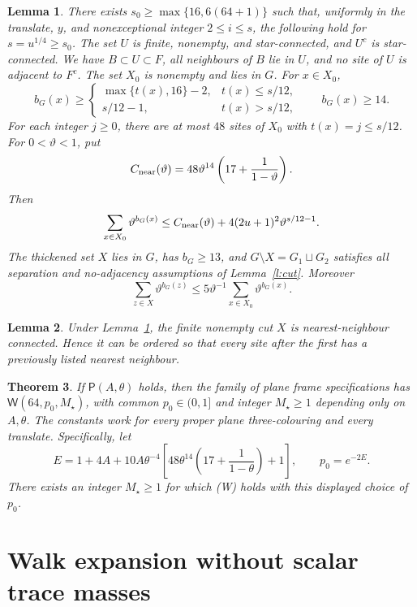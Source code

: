 \documentclass[11pt,reqno]{amsart}
\newtheorem{theorem}{Theorem}[section]
\newtheorem{lemma}[theorem]{Lemma}
\theoremstyle{definition}
\theoremstyle{remark}
\begin{document}
\begin{lemma}\label{l:cutgeom}
There exists \(s_0\ge\max\{16,6(64+1)\}\) such that, uniformly
in the translate, \(y\), and nonexceptional integer \(2\le i\le s\),
the following hold for \(s=u^{1/4}\ge s_0\).
The set \(U\) is finite, nonempty, and star-connected, and \(U^c\)
is star-connected. We have \(B\subset U\subset F\), all neighbours
of \(B\) lie in \(U\), and no site of \(U\) is adjacent to \(F^c\).
The set \(X_0\) is nonempty and lies in \(G\). For \(x\in X_0\),
\[
 b_G(x)\ge
 \begin{cases}\max\{t(x),16\}-2,&t(x)\le s/12,\\s/12-1,&t(x)>s/12,
 \end{cases}
 \qquad b_G(x)\ge14 .
 \]
For each integer \(j\ge0\), there are at most \(48\) sites of
\(X_0\) with \(t(x)=j\le s/12\).
For \(0<\vartheta<1\), put
\[
 C_{\rm near}(\vartheta)=48\vartheta^{14}
                \left(17+\frac1{1-\vartheta}\right).
\]
Then
\[
 \sum_{x\in X_0}\vartheta^{b_G(x)}
 \le C_{\rm near}(\vartheta)
                 +4(2u+1)^2\vartheta^{s/12-1}.
\]
The thickened set \(X\) lies in \(G\), has \(b_G\ge13\), and
\(G\setminus X=G_1\sqcup G_2\) satisfies all separation and
no-adjacency assumptions of Lemma~\ref{l:cut}. Moreover
\[
 \sum_{z\in X}\vartheta^{b_G(z)}
       \le5\vartheta^{-1}\sum_{x\in X_0}\vartheta^{b_G(x)} .
\]
\end{lemma}

\begin{lemma}\label{l:Xconn}
Under Lemma~\ref{l:cutgeom}, the finite nonempty cut \(X\) is
nearest-neighbour connected. Hence it can be ordered so that every
site after the first has a previously listed nearest neighbour.
\end{lemma}

\begin{theorem}\label{t:cutMOS}
If \(\mathsf P(A,\theta)\) holds, then the family of plane frame
specifications has \(\mathsf W(64,p_0,M_\star)\), with common
\(p_0\in(0,1]\) and integer \(M_\star\ge1\) depending only on
\(A,\theta\). The constants work for every proper plane
three-colouring and every translate.
Specifically, let
\[
 E=1+4A+10A\theta^{-4}
       \left[48\theta^{14}\left(17+\frac1{1-\theta}\right)+1\right],
 \qquad p_0=e^{-2E}.
\]
There exists an integer \(M_\star\ge1\) for which (W) holds
with this displayed choice of \(p_0\).
\end{theorem}


\section{Walk expansion without scalar trace masses}
\end{document}
